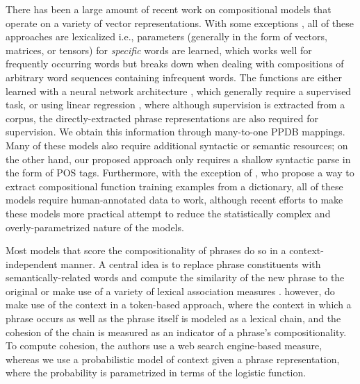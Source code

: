 \documentclass[11pt,letterpaper]{article}
\begin{document}
There has been a large amount of recent work on compositional models that operate on a variety of vector representations. 
With some exceptions \cite{Mitchell2008,Mitchell2010}, all of these approaches are lexicalized i.e., parameters (generally in the form of vectors, matrices, or tensors) for \emph{specific} words are learned, which works well for frequently occurring words but breaks down when dealing with compositions of arbitrary word sequences containing infrequent words. 
The functions are either learned with a neural network architecture \cite[\emph{inter alia}]{Socher2013}, which generally require a supervised task, or using linear regression \cite{Baroni2010,Zanzotto2010}, where although supervision is extracted from a corpus, the directly-extracted phrase representations are also required for supervision.
We obtain this information through many-to-one PPDB mappings. 
Many of these models also require additional syntactic \cite{Socher2012} or semantic \cite{Hermann2013,Grefenstette2013} resources; on the other hand, our proposed approach only requires a shallow syntactic parse in the form of POS tags. 
Furthermore, with the exception of , who propose a way to extract compositional function training examples from a dictionary, all of these models require human-annotated data to work, although recent efforts to make these models more practical \cite{Paperno2014} attempt to reduce the statistically complex and overly-parametrized nature of the models.  

Most models that score the compositionality of phrases do so in a context-independent manner. 
A central idea is to replace phrase constituents with semantically-related words and compute the similarity of the new phrase to the original \cite{Kiela2013,Salehi2014} or make use of a variety of lexical association measures \cite{Lin1999,Pecina2006}. 
 however, do make use of the context in a token-based approach, where the context in which a phrase occurs as well as the phrase itself is modeled as a lexical chain, and the cohesion of the chain is measured as an indicator of a phrase's compositionality. 
To compute cohesion, the authors use a web search engine-based measure, whereas we use a probabilistic model of context given a phrase representation, where the probability is parametrized in terms of the logistic function.  
\end{document}
